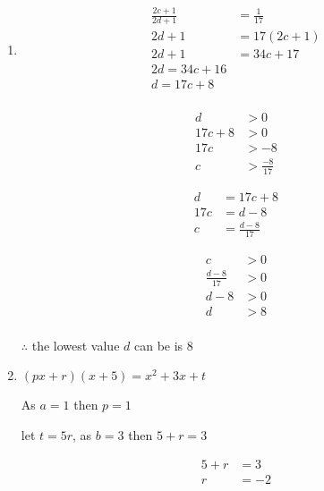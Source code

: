 \documentclass[11pt]{article}
\begin{document}
\begin{enumerate}[{\bf Q1.}]
\begin{enumerate}
		\item 

         \[
            \begin{aligned}
                \frac{2c + 1}{2d + 1} &= \frac{1}{17} \\
                2d + 1 &= 17(2c + 1)\\
                2d + 1 &= 34c + 17\\
                2d = 34c + 16\\
                d = 17c + 8\\
            \end{aligned}   
         \]

         \[
            \begin{aligned}
                d &> 0\\
                17c + 8 &> 0\\
                17c &> -8\\
                c &> \frac{-8}{17}
            \end{aligned}   
         \]

         \[
            \begin{aligned}
                d &= 17c + 8\\
                17c &= d - 8\\
                c &= \frac{d-8}{17}
            \end{aligned}
         \]

         \[
            \begin{aligned}
                c &> 0\\
                \frac{d-8}{17} &> 0\\
                d - 8 &> 0\\
                d &> 8\\
            \end{aligned}   
         \]

         $\therefore$ the lowest value $d$ can be is $8$

		\item $(px + r)(x + 5) = x^2 + 3x + t$
		
        As $a = 1$ then $p = 1$

        let $t = 5r$, as $b = 3$ then $5 + r = 3$

        \[
            \begin{aligned}
                5 + r &= 3\\
                r &= -2
            \end{aligned}    
        \]


\end{enumerate}
\end{enumerate}
\end{document}
